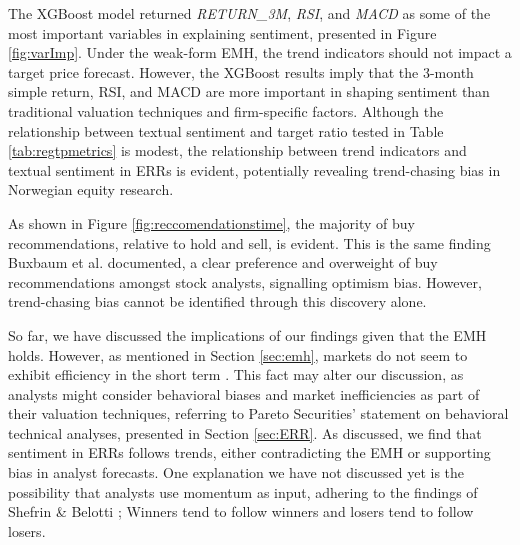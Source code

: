 The XGBoost model returned \textit{RETURN\_3M}, \textit{RSI}, and \textit{MACD} as some of the most important variables in explaining sentiment, presented in Figure \ref{fig:varImp}. Under the weak-form EMH, the trend indicators should not impact a target price forecast. However, the XGBoost results imply that the 3-month simple return, RSI, and MACD are more important in shaping sentiment than traditional valuation techniques and firm-specific factors. Although the relationship between textual sentiment and target ratio tested in Table \ref{tab:regtpmetrics} is modest, the relationship between trend indicators and textual sentiment in ERRs is evident, potentially revealing trend-chasing bias in Norwegian equity research. 

As shown in Figure \ref{fig:reccomendationstime}, the majority of buy recommendations, relative to hold and sell, is evident. This is the same finding Buxbaum et al. \parencite*{buxbaum2019target} documented, a clear preference and overweight of buy recommendations amongst stock analysts, signalling optimism bias. However, trend-chasing bias cannot be identified through this discovery alone. 


So far, we have discussed the implications of our findings given that the EMH holds. However, as mentioned in Section \ref{sec:emh}, markets do not seem to exhibit efficiency in the short term \parencite*{naseer2015efficient}. This fact may alter our discussion, as analysts might consider behavioral biases and market inefficiencies as part of their valuation techniques, referring to Pareto Securities' statement on behavioral technical analyses, presented in Section \ref{sec:ERR}. As discussed, we find that sentiment in ERRs follows trends, either contradicting the EMH or supporting bias in analyst forecasts. One explanation we have not discussed yet is the possibility that analysts use momentum as input, adhering to the findings of Shefrin \& Belotti \parencite*{shefrin2007behavioral}; Winners tend to follow winners and losers tend to follow losers. 



